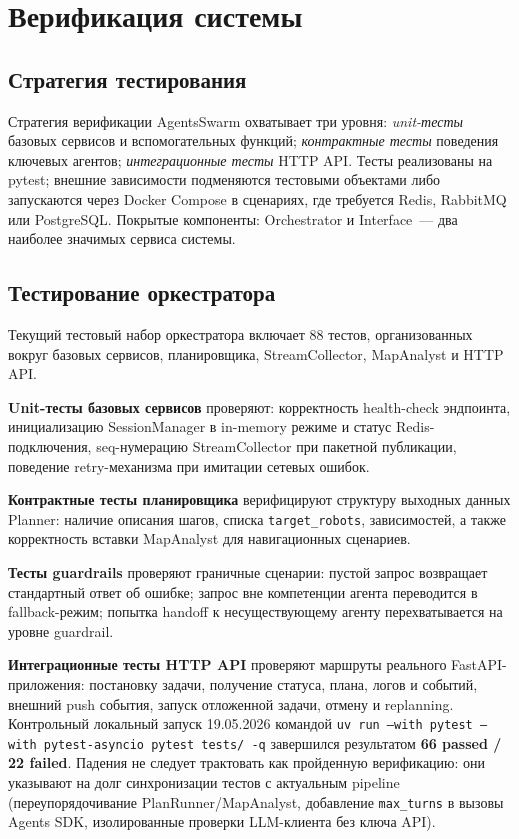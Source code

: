\documentclass[14pt,a4paper]{extreport}
\begin{document}
\chapter{Верификация системы}

\section{Стратегия тестирования}

Стратегия верификации AgentsSwarm охватывает три уровня: \textit{unit-тесты} базовых сервисов и вспомогательных функций; \textit{контрактные тесты} поведения ключевых агентов; \textit{интеграционные тесты} HTTP API. Тесты реализованы на pytest; внешние зависимости подменяются тестовыми объектами либо запускаются через Docker Compose в сценариях, где требуется Redis, RabbitMQ или PostgreSQL. Покрытые компоненты: Orchestrator и Interface~--- два наиболее значимых сервиса системы.

\section{Тестирование оркестратора}

Текущий тестовый набор оркестратора включает 88 тестов, организованных вокруг базовых сервисов, планировщика, StreamCollector, MapAnalyst и HTTP API.

\textbf{Unit-тесты базовых сервисов} проверяют: корректность health-check эндпоинта, инициализацию SessionManager в in-memory режиме и статус Redis-подключения, seq-нумерацию StreamCollector при пакетной публикации, поведение retry-механизма при имитации сетевых ошибок.

\textbf{Контрактные тесты планировщика} верифицируют структуру выходных данных Planner: наличие описания шагов, списка \texttt{target\_robots}, зависимостей, а также корректность вставки MapAnalyst для навигационных сценариев.

\textbf{Тесты guardrails} проверяют граничные сценарии: пустой запрос возвращает стандартный ответ об ошибке; запрос вне компетенции агента переводится в fallback-режим; попытка handoff к несуществующему агенту перехватывается на уровне guardrail.

\textbf{Интеграционные тесты HTTP API} проверяют маршруты реального FastAPI-приложения: постановку задачи, получение статуса, плана, логов и событий, внешний push события, запуск отложенной задачи, отмену и replanning. Контрольный локальный запуск 19.05.2026 командой \texttt{uv run --with pytest --with pytest-asyncio pytest tests/ -q} завершился результатом \textbf{66 passed / 22 failed}. Падения не следует трактовать как пройденную верификацию: они указывают на долг синхронизации тестов с актуальным pipeline (переупорядочивание PlanRunner/MapAnalyst, добавление \texttt{max\_turns} в вызовы Agents SDK, изолированные проверки LLM-клиента без ключа API).
\end{document}
